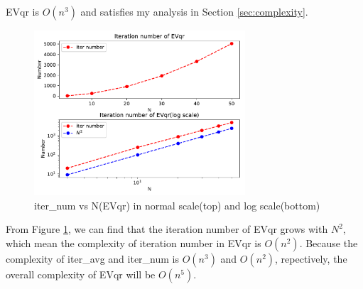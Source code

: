 \documentclass{article}
\begin{document}
EVqr is {\boldmath$O(n^3)$} and satisfies my analysis in Section \ref{sec:complexity}.
\begin{figure}[H]
    \centering
    \includegraphics[width=0.7\textwidth]{src/iter_num_unshifted.pdf}
    \caption{iter\_num vs N(EVqr) in normal scale(top) and log scale(bottom)}
    \label{fig:iter num evqr}
\end{figure}
From Figure \ref{fig:iter num evqr}, we can find that the iteration number of EVqr grows with $N^2$, which mean the complexity of iteration number
in EVqr is {\boldmath$O(n^2)$}. Because the complexity of iter\_avg and iter\_num is $O(n^3)$ and $O(n^2)$, repectively, the overall complexity of
EVqr will be {\boldmath$O(n^5)$}.
\end{document}
